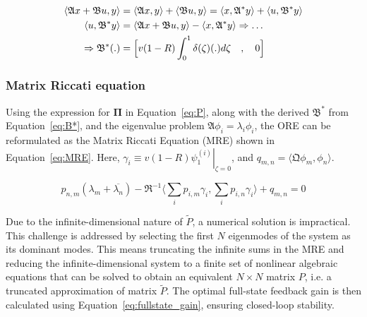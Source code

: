 \begin{equation} \label{eq:B*}
    \begin{aligned}
        \langle \mathfrak{A} x + \mathfrak{B} u, y \rangle
        &= \langle \mathfrak{A} x, y \rangle
        + \langle \mathfrak{B} u, y \rangle
        = \langle x, \mathfrak{A}^* y\rangle
        + \langle u, \mathfrak{B}^* y \rangle \\
        \langle u, \mathfrak{B}^* y \rangle
        &= \langle \mathfrak{A} x + \mathfrak{B} u, y \rangle
        - \langle x, \mathfrak{A}^* y\rangle
        \Rightarrow \hdots \\ \Rightarrow \mathfrak{B}^* (.) &= \Bigl[ v(1-R) \int_0^1 \delta(\zeta) (.) d\zeta \quad , \quad 0 \Bigr]
    \end{aligned}
\end{equation}

\subsubsection{Matrix Riccati equation}

Using the expression for $\mathbf{\Pi}$ in Equation~\ref{eq:P}, along with the derived $\mathfrak{B}^*$ from Equation~\ref{eq:B*}, and the eigenvalue problem $\mathfrak{A}\phi_i = \lambda_i \phi_i$, the ORE can be reformulated as the Matrix Riccati Equation (MRE) shown in Equation~\ref{eq:MRE}. Here, $\gamma_i \equiv v(1-R) \left. \psi_{1}^{(i)} \right|_{\zeta = 0}$, and $q_{m,n} = \langle \mathfrak{Q} \phi_m, \phi_n \rangle$.

\begin{equation}\label{eq:MRE}
    p_{n,m} (\lambda_m + \overline{\lambda_n})
    - \mathfrak{R}^{-1} \langle \sum_i p_{i,m} \gamma_i, \sum_i p_{i,n} \gamma_i \rangle
    + q_{m,n} = 0
\end{equation}

Due to the infinite-dimensional nature of $\tilde{P}$, a numerical solution is impractical. This challenge is addressed by selecting the first $N$ eigenmodes of the system as its dominant modes. This means truncating the infinite sums in the MRE and reducing the infinite-dimensional system to a finite set of nonlinear algebraic equations that can be solved to obtain an equivalent $N \times N$ matrix $P$, i.e. a truncated approximation of matrix $\tilde{P}$. The optimal full-state feedback gain is then calculated using Equation~\ref{eq:fullstate_gain}, ensuring closed-loop stability.


